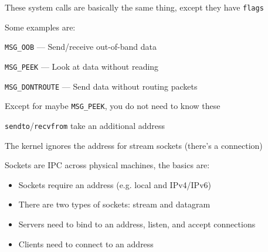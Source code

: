   \begin{slide}
    

    These system calls are basically the same thing, except they have
    \texttt{flags}
    \medskip

    Some examples are:

    \leftspace{}\texttt{MSG\_OOB} --- Send/receive out-of-band data

    \leftspace{}\texttt{MSG\_PEEK} --- Look at data without reading
    
    \leftspace{}\texttt{MSG\_DONTROUTE} --- Send data without routing packets
    \medskip

    Except for maybe \texttt{MSG\_PEEK}, you do not need to know these
    \medskip

    \texttt{sendto}/\texttt{recvfrom} take an additional address

    \leftspace{}The kernel ignores the address for stream sockets (there's a
                 connection)

  \end{slide}

  \begin{slide}
    

    Sockets are IPC across physical machines, the basics are:

    \begin{itemize}
      \item Sockets require an address (e.g. local and IPv4/IPv6)
      \item There are two types of sockets: stream and datagram
      \item Servers need to bind to an address, listen, and accept connections
      \item Clients need to connect to an address
    \end{itemize}

  \end{slide}


